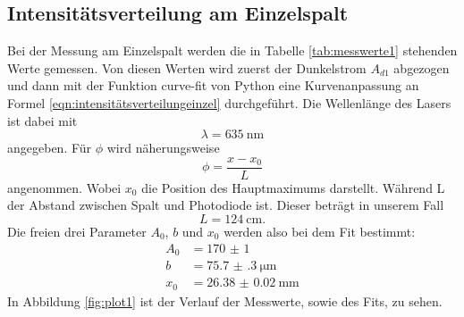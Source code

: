 \documentclass[
  bibliography=totoc,     %
  captions=tableheading,  %
  titlepage=firstiscover, %
]{scrartcl}
\begin{document}
\subsection{Intensitätsverteilung am Einzelspalt}
Bei der Messung am Einzelspalt werden die in Tabelle \ref{tab:messwerte1}
stehenden Werte gemessen. Von diesen Werten wird zuerst der Dunkelstrom
$A_{d1}$ abgezogen und dann mit der Funktion curve-fit von Python eine
Kurvenanpassung an Formel \eqref{eqn:intensitätsverteilungeinzel} durchgeführt.
Die Wellenlänge des Lasers ist dabei mit
\begin{equation*}
  \lambda = \SI{635}{\nano\meter}
\end{equation*}
angegeben. Für $\phi$ wird näherungsweise
\begin{equation}
  \phi = \frac{x-x_0}{L}
\end{equation}
angenommen. Wobei $x_0$ die Position des Hauptmaximums darstellt. Während L
der Abstand zwischen Spalt und Photodiode ist. Dieser beträgt in unserem Fall
\begin{equation*}
  L = \SI{124}{\centi\meter}.
\end{equation*}
Die freien drei Parameter $A_0$, $b$ und $x_0$ werden also bei dem Fit
bestimmt:
\begin{align*}
  A_0 &= \SI{170(1)}{}\\
  b &= \SI{75.7(3)}{\micro\meter}\\
  x_0 &= \SI{26.38(2)}{\milli\meter}
\end{align*}
In Abbildung \ref{fig:plot1} ist der Verlauf der Messwerte, sowie des Fits,
zu sehen.
\end{document}
